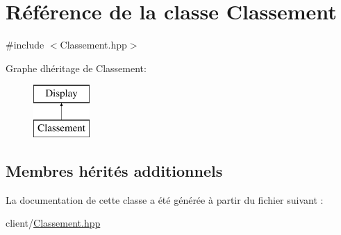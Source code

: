 \hypertarget{classClassement}{}\section{Référence de la classe Classement}
\label{classClassement}


{\ttfamily \#include $<$Classement.\+hpp$>$}

Graphe d\textquotesingle{}héritage de Classement\+:\begin{figure}[H]
\begin{center}
\leavevmode
\includegraphics[height=2.000000cm]{classClassement}
\end{center}
\end{figure}
\subsection*{Membres hérités additionnels}


La documentation de cette classe a été générée à partir du fichier suivant \+:\begin{DoxyCompactItemize}
\item 
client/\hyperlink{Classement_8hpp}{Classement.\+hpp}\end{DoxyCompactItemize}
